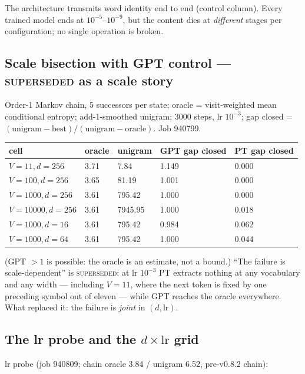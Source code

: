 \documentclass[10pt,a4paper]{article}
\begin{document}
The architecture transmits word identity end to end (control column). Every trained model
ends at $10^{-5}$--$10^{-9}$, but the content dies at \emph{different} stages per
configuration; no single operation is broken.

\subsection{Scale bisection with GPT control --- \textsc{superseded} as a scale story}

Order-1 Markov chain, 5 successors per state; oracle = visit-weighted mean conditional
entropy; add-1-smoothed unigram; 3000 steps, lr $10^{-3}$; gap closed =
$(\mathrm{unigram}-\mathrm{best})/(\mathrm{unigram}-\mathrm{oracle})$. Job 940799.

\begin{table}[h]\centering\small
\begin{tabular}{lllll}
\toprule
cell & oracle & unigram & GPT gap closed & PT gap closed\\
\midrule
$V{=}11, d{=}256$ & 3.71 & 7.84 & 1.149 & 0.000\\
$V{=}100, d{=}256$ & 3.65 & 81.19 & 1.001 & 0.000\\
$V{=}1000, d{=}256$ & 3.61 & 795.42 & 1.000 & 0.000\\
$V{=}10000, d{=}256$ & 3.61 & 7945.95 & 1.000 & 0.018\\
$V{=}1000, d{=}16$ & 3.61 & 795.42 & 0.984 & 0.062\\
$V{=}1000, d{=}64$ & 3.61 & 795.42 & 1.000 & 0.044\\
\bottomrule
\end{tabular}
\end{table}

(GPT $>1$ is possible: the oracle is an estimate, not a bound.) ``The failure is
scale-dependent'' is \textsc{superseded}: at lr $10^{-3}$ PT extracts nothing at any
vocabulary and any width --- including $V=11$, where the next token is fixed by one
preceding symbol out of eleven --- while GPT reaches the oracle everywhere. What replaced
it: the failure is \emph{joint} in $(d, \mathrm{lr})$.

\subsection{The lr probe and the $d \times \mathrm{lr}$ grid}

lr probe (job 940809; chain oracle 3.84 / unigram 6.52, pre-v0.8.2 chain):
\end{document}
